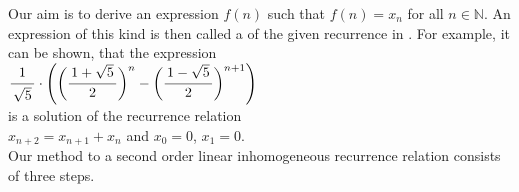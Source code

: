 \noindent
Our aim is to derive an expression $f(n)$ such that $f(n) = x_n$ for all $n\in\mathbb{N}$.  An expression of
this kind is then called a  of the given recurrence in .  For example, it can
be shown, that the expression
\\[0.2cm]
\hspace*{1.3cm}
$\ds \bruch{1}{\sqrt{5}} \cdot \left(\biggl(\bruch{1+\sqrt{5}}{2}\biggr)^{n} - \biggl(\bruch{1-\sqrt{5}}{2}\biggr)^{n+1}\right)$ \quad
\\[0.2cm]
is a solution of the recurrence relation 
\\[0.2cm]
\hspace*{1.3cm}
$x_{n+2} = x_{n+1} + x_n$ \quad and \quad $x_0 = 0$, $x_1 = 0$.
\\[0.2cm]
Our method to  a second order linear inhomogeneous recurrence relation consists of three steps.
